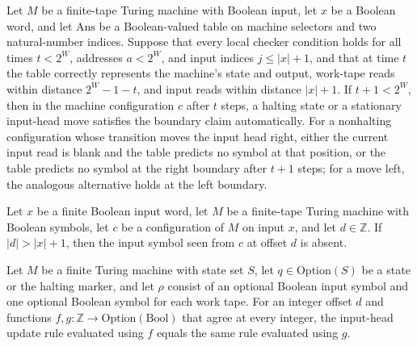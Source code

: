 \begin{theorem}
\label{Complexity.Meyer.bd_edge}
\leanok
{}
Let $M$ be a finite-tape Turing machine with Boolean input, let $x$ be a Boolean word,
and let $\mathrm{Ans}$ be a Boolean-valued table on machine selectors and two
natural-number indices. Suppose that every local checker condition holds for all times
$t<2^W$, addresses $a<2^W$, and input indices $j\le |x|+1$, and that at time $t$ the
table correctly represents the machine's state and output, work-tape reads within
distance $2^W-1-t$, and input reads within distance $|x|+1$. If $t+1<2^W$, then in the
machine configuration $c$ after $t$ steps, a halting state or a stationary input-head
move satisfies the boundary claim automatically. For a nonhalting configuration whose
transition moves the input head right, either the current input read is blank and the
table predicts no symbol at that position, or the table predicts no symbol at the right
boundary after $t+1$ steps; for a move left, the analogous alternative holds at the left
boundary.
\end{theorem}

\begin{theorem}
\label{Complexity.Meyer.RI_far}
\leanok
{}
Let $x$ be a finite Boolean input word, let $M$ be a finite-tape Turing machine with
Boolean symbols, let $c$ be a configuration of $M$ on input $x$, and let
$d\in\mathbb{Z}$. If $|d|>|x|+1$, then the input symbol seen from $c$ at offset $d$ is
absent.
\end{theorem}

\begin{theorem}
\label{Complexity.Meyer.ruleI_congr}
\leanok
{}
Let $M$ be a finite Turing machine with state set $S$, let $q\in\mathrm{Option}(S)$ be a
state or the halting marker, and let $\rho$ consist of an optional Boolean input symbol
and one optional Boolean symbol for each work tape. For an integer offset $d$ and
functions $f,g:\mathbb{Z}\to\mathrm{Option}(\mathrm{Bool})$ that agree at every integer,
the input-head update rule evaluated using $f$ equals the same rule evaluated using $g$.
\end{theorem}

